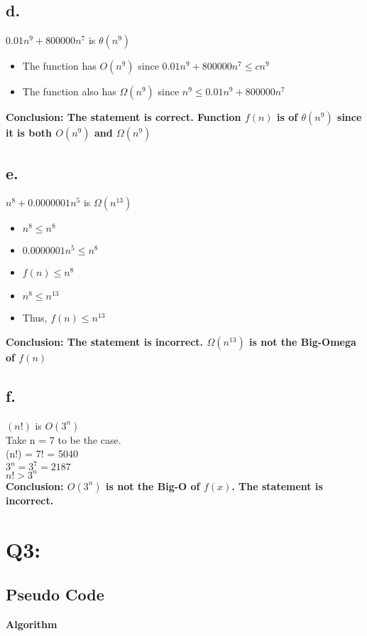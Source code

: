 \documentclass{article}
\begin{document}
\subsection*{d.}%
$0.01n^9 + 800000n^7$ is $\theta(n^9)$
\begin{itemize}
	\item[] The function has $O(n^9)$ since $0.01n^9 + 800000n^7 \leq cn^9$
	\item[] The function also has $\Omega(n^9)$ since $n^9 \leq 0.01n^9 + 800000n^7$ 
\end{itemize}
\textbf{Conclusion: The statement is correct. Function $f(n)$ is of $\theta(n^9)$ since it is both $O(n^9)$ and $\Omega(n^9)$}

\subsection*{e.}%
$n^8 + 0.0000001n^5$ is $\Omega(n^{13})$
\begin{itemize}
	\item[] $n^8 \leq n^8$
	\item[] $0.0000001n^5 \leq n^8$
	\item[] $f(n) \leq n^8$
	\item[] $n^8 \leq n^{13}$
	\item[]Thus, $f(n) \leq n^{13}$
\end{itemize}
\textbf{Conclusion: The statement is incorrect. $\Omega(n^{13})$ is not the Big-Omega of $f(n)$}

\subsection*{f.}%
$(n!)$ is $O(3^n)$
\\
Take n = 7 to be the case. 
\\
{(n!) = 7! = 5040}
\\
{$3^n = 3^7 = 2187$}
\\
$n! > 3^n$
\\
\textbf{Conclusion: $O(3^n)$ is not the Big-O of $f(x)$. The statement is incorrect.}

\section*{Q3:}%

\subsection*{Pseudo Code}
\textbf{Algorithm }  
\end{document}
